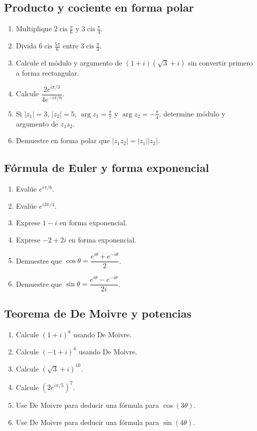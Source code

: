 \documentclass[12pt]{article}
\begin{document}
\subsection*{Producto y cociente en forma polar}
\begin{enumerate}
\item Multiplique $2\operatorname{cis}\frac{\pi}{6}$ y $3\operatorname{cis}\frac{\pi}{4}$.
\item Divida $6\operatorname{cis}\frac{5\pi}{6}$ entre $3\operatorname{cis}\frac{\pi}{3}$.
\item Calcule el módulo y argumento de $(1+i)(\sqrt3+i)$ sin convertir primero a forma rectangular.
\item Calcule $\dfrac{2e^{i\pi/3}}{4e^{-i\pi/6}}$.
\item Si $|z_1|=3$, $|z_2|=5$, $\arg z_1=\frac{\pi}{7}$ y $\arg z_2=-\frac{\pi}{4}$, determine módulo y argumento de $z_1z_2$.
\item Demuestre en forma polar que $|z_1z_2|=|z_1||z_2|$.
\end{enumerate}

\subsection*{Fórmula de Euler y forma exponencial}
\begin{enumerate}
\item Evalúe $e^{i\pi/6}$.
\item Evalúe $e^{i3\pi/4}$.
\item Exprese $1-i$ en forma exponencial.
\item Exprese $-2+2i$ en forma exponencial.
\item Demuestre que $\cos\theta=\dfrac{e^{i\theta}+e^{-i\theta}}{2}$.
\item Demuestre que $\sin\theta=\dfrac{e^{i\theta}-e^{-i\theta}}{2i}$.
\end{enumerate}

\subsection*{Teorema de De Moivre y potencias}
\begin{enumerate}
\item Calcule $(1+i)^8$ usando De Moivre.
\item Calcule $(-1+i)^6$ usando De Moivre.
\item Calcule $(\sqrt3+i)^{10}$.
\item Calcule $\left(2e^{i\pi/5}\right)^7$.
\item Use De Moivre para deducir una fórmula para $\cos(3\theta)$.
\item Use De Moivre para deducir una fórmula para $\sin(4\theta)$.
\end{enumerate}
\end{document}
